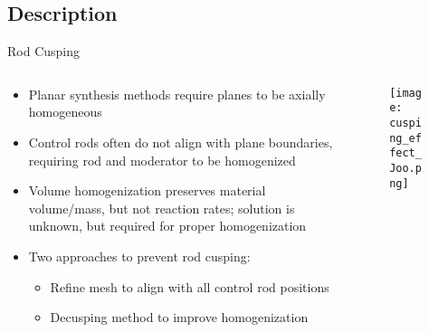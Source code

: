\subsection{Description}

\begin{frame}[t]{Rod Cusping}

\begin{columns}
    \begin{column}{0.6\textwidth}
        \begin{itemize}
            \item Planar synthesis methods require planes to be axially homogeneous
            \item Control rods often do not align with plane boundaries, 
            requiring rod and moderator to be homogenized
            \item Volume homogenization preserves material volume/mass, but not 
            reaction rates; solution is unknown, but required for proper homogenization
            \item Two approaches to prevent rod cusping:
            \vspace{-8pt}
            \begin{itemize}
                \item Refine mesh to align with all control rod positions
                \item Decusping method to improve homogenization
            \end{itemize}
        \end{itemize}
    \end{column}
    \begin{column}{0.4\textwidth}
        \begin{figure}[h]
            \centering
            \texttt{[image: cusping\_effect\_Joo.png]}
        \end{figure} 
    \end{column}
\end{columns}

\end{frame}


